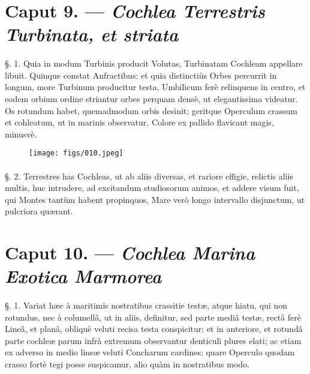 \documentclass[a4paper, 11pt, oneside, polutonikogreek, german]{article}
\begin{document}
\paragraph{}
\section{Caput 9. --- \emph{Cochlea Terrestris Turbinata, et striata}}
\paragraph{}
§. 1. Quia in modum Turbinis producit Volutas, Turbinatam Cochleam appellare libuit. Quinque constat Anfractibus: et quia distinctiùs Orbes percurrit in longum, more Turbinum producitur testa, Umbilicum ferè relinquens in centro, et eodem orbium ordine striantur orbes perquam densè, ut elegantissima videatur. Os rotundum habet, quemadmodum orbis desinit; geritque Operculum crassum et cohleatum, ut in marinis observatur. Colore ex pallido flavicant magis, minusvè.

\begin{figure}[H]
\centering
\texttt{[image: figs/010.jpeg]}

\end{figure}
\paragraph{}
§. 2. Terrestres has Cochleas, ut ab aliis diversas, et rariore effigie, relictis aliis multis, huc intrudere, ad excitandum studiosorum animos, et addere visum fuit, qui Montes tantùm habent propinquos, Mare verò longo intervallo disjunctum, ut pulcriora quærant.

\section{Caput 10. --- \emph{Cochlea Marina Exotica Marmorea}}
\paragraph{}
§. 1. Variat hæc à maritimis nostratibus crassitie testæ, atque hiatu, qui non rotundus, nec à columellâ, ut in aliis, definitur, sed parte mediâ testæ, rectâ ferè Lineâ, et planâ, obliquè veluti recisa testa conspicitur: et in anteriore, et rotundâ parte cochleæ parum infrà extremum observantur denticuli plures elati; ac etiam ex adverso in medio lineæ veluti Concharum cardines; quare Operculo quodam crasso fortè tegi posse suspicamur, alio quàm in nostratibus modo.
\end{document}
